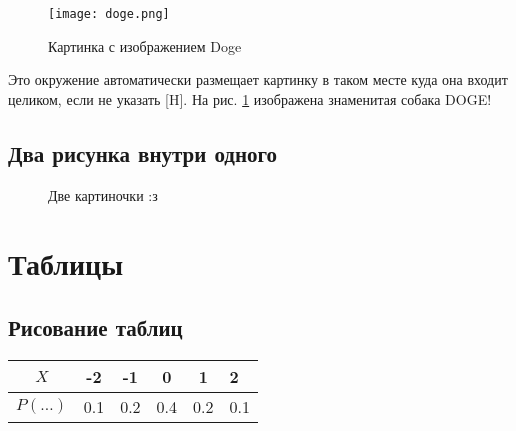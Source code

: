 \documentclass[12pt, a4paper]{article}
\begin{document}
\begin{figure}[H]
\begin{center}
\texttt{[image: doge.png]}
\end{center}
\caption{Картинка с изображением Doge}\label{pic:doge}
\end{figure}

Это окружение автоматически размещает картинку в таком месте куда она входит целиком, если не указать [H].  На рис. \ref{pic:doge} изображена знаменитая собака DOGE!


\subsection{Два рисунка внутри одного}

\begin{figure}[H]
\begin{minipage}[H]{0.29\linewidth} 
\end{minipage}
\hfill
\begin{minipage}[H]{0.69\linewidth}
\end{minipage}
\caption{Две картиночки :з}
\label{fig:1figs}
\end{figure}


\newpage


\section{Таблицы}



\subsection{Рисование таблиц}

\begin{tabular}{|c|c|c|cc|p{6cm}|}
\hline
$X$ & -2 & -1 & 0 & 1 & 2 \\
\hline
$P(\ldots)$ & 0.1 & 0.2 & 0.4 & 0.2 & 0.1 \\
\end{tabular}
\end{document}
